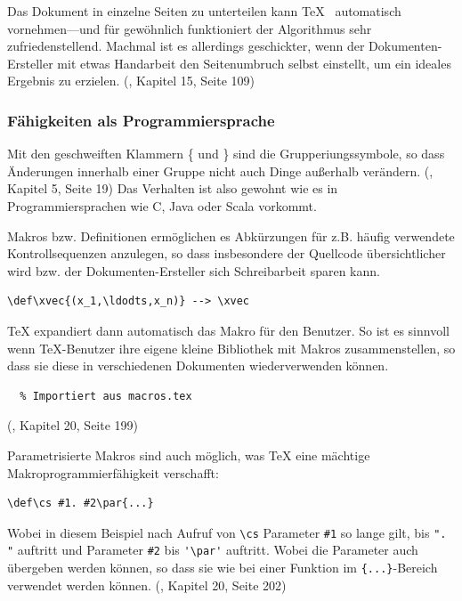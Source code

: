 Das Dokument in einzelne Seiten zu unterteilen kann \TeX~ automatisch
vornehmen---und für gewöhnlich funktioniert der Algorithmus sehr
zufriedenstellend. Machmal ist es allerdings geschickter, wenn der Dokumenten-Ersteller
mit etwas Handarbeit den Seitenumbruch selbst einstellt, um ein ideales
Ergebnis zu erzielen. (\cite{tex-a}, Kapitel 15, Seite 109)

\subsubsection{Fähigkeiten als Programmiersprache}

Mit den geschweiften Klammern \{ und \} sind die Grupperiungssymbole, so
dass Änderungen innerhalb einer Gruppe nicht auch Dinge außerhalb
verändern. (\cite{tex-a}, Kapitel 5, Seite 19)
Das Verhalten ist also gewohnt wie es in Programmiersprachen wie C,
Java oder Scala vorkommt.

Makros bzw. Definitionen ermöglichen es Abkürzungen für z.B. häufig
verwendete Kontrollsequenzen anzulegen, so dass insbesondere
der Quellcode übersichtlicher wird bzw. der Dokumenten-Ersteller sich
Schreibarbeit sparen kann.

\begin{verbatim}
\def\xvec{(x_1,\ldodts,x_n)} --> \xvec
\end{verbatim}

TeX expandiert dann automatisch das Makro für den Benutzer.
So ist es sinnvoll wenn TeX-Benutzer ihre eigene kleine Bibliothek mit
Makros zusammenstellen, so dass sie diese in verschiedenen Dokumenten
wiederverwenden können.

\begin{verbatim}
  % Importiert aus macros.tex
\end{verbatim}

(\cite{tex-a}, Kapitel 20, Seite 199)

Parametrisierte Makros sind auch möglich, was TeX eine mächtige
Makroprogrammierfähigkeit verschafft:

\begin{verbatim}
\def\cs #1. #2\par{...}
\end{verbatim}

Wobei in diesem Beispiel nach Aufruf von \lstinline|\cs| Parameter
\lstinline|#1| so lange gilt,
bis \lstinline|". "| auftritt und Parameter \lstinline|#2|
bis \lstinline|'\par'| auftritt.
Wobei die Parameter auch übergeben werden können, so dass sie wie
bei einer Funktion im \lstinline|{...}|-Bereich verwendet werden können.
(\cite{tex-a}, Kapitel 20, Seite 202)

